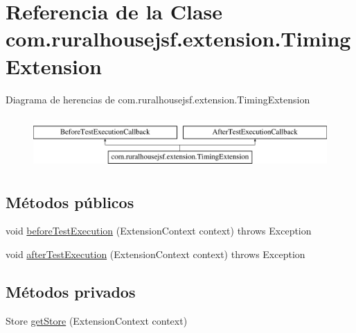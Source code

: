 \hypertarget{classcom_1_1ruralhousejsf_1_1extension_1_1_timing_extension}{}\section{Referencia de la Clase com.\+ruralhousejsf.\+extension.\+Timing\+Extension}
\label{classcom_1_1ruralhousejsf_1_1extension_1_1_timing_extension}
Diagrama de herencias de com.\+ruralhousejsf.\+extension.\+Timing\+Extension\begin{figure}[H]
\begin{center}
\leavevmode
\includegraphics[height=2.000000cm]{d0/dea/classcom_1_1ruralhousejsf_1_1extension_1_1_timing_extension}
\end{center}
\end{figure}
\subsection*{Métodos públicos}
\begin{DoxyCompactItemize}
\item 
void \mbox{\hyperlink{classcom_1_1ruralhousejsf_1_1extension_1_1_timing_extension_ad19d0a2513bd9041f9263c1d9536ed6c}{before\+Test\+Execution}} (Extension\+Context context)  throws Exception 
\item 
void \mbox{\hyperlink{classcom_1_1ruralhousejsf_1_1extension_1_1_timing_extension_a300725ce5f0290e9878185e05d84c019}{after\+Test\+Execution}} (Extension\+Context context)  throws Exception 
\end{DoxyCompactItemize}
\subsection*{Métodos privados}
\begin{DoxyCompactItemize}
\item 
Store \mbox{\hyperlink{classcom_1_1ruralhousejsf_1_1extension_1_1_timing_extension_a489c3097fd687a25391189f3fec56fa8}{get\+Store}} (Extension\+Context context)
\end{DoxyCompactItemize}
